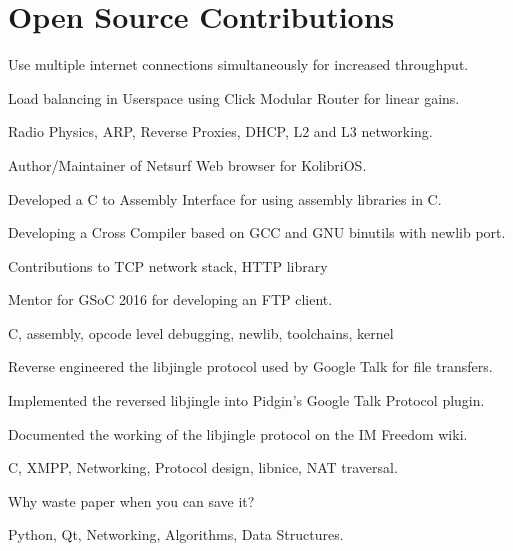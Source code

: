 \documentclass[letterpaper]{deedy-resume-openfont} %
\begin{document}
\begin{minipage}[t]{0.66\textwidth}
\section{Open Source Contributions}
\begin{tightemize}
\item Use multiple internet connections simultaneously for increased throughput.
\item Load balancing in Userspace using Click Modular Router for linear gains.
\item Radio Physics, ARP, Reverse Proxies, DHCP, L2 and L3 networking.
\end{tightemize}
\sectionsep %
\begin{tightemize}
\item Author/Maintainer of Netsurf Web browser for KolibriOS.
\item Developed a C to Assembly Interface for using assembly libraries in C.
\item Developing a Cross Compiler based on GCC and GNU binutils with newlib port.
\item Contributions to TCP network stack, HTTP library
\item Mentor for GSoC 2016 for developing an FTP client.
\item C, assembly, opcode level debugging, newlib, toolchains, kernel
\end{tightemize}
\sectionsep %
\begin{tightemize}
\item Reverse engineered the libjingle protocol used by Google Talk for file transfers.
\item Implemented the reversed libjingle into Pidgin's Google Talk Protocol plugin.
\item Documented the working of the libjingle protocol on the IM Freedom wiki.
\item C, XMPP, Networking, Protocol design, libnice, NAT traversal.
\end{tightemize}
\sectionsep %
\begin{tightemize}
\item Why waste paper when you can save it?
\item Python, Qt, Networking, Algorithms, Data Structures.
\end{tightemize}
\sectionsep %

\end{minipage}
\end{document}

